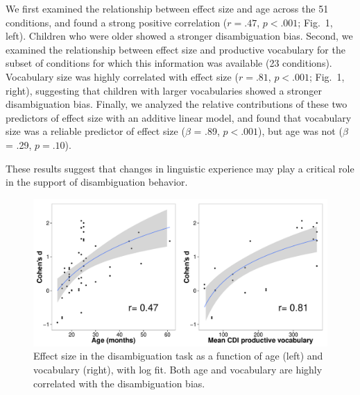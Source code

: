 \documentclass[12pt]{article}
\begin{document}
We first examined the relationship between effect size and age across the 51 conditions, and found a strong positive correlation ($r=.47$, $p<.001$; Fig.\ 1, left). Children who were older showed a stronger disambiguation bias. Second, we examined the relationship between effect size and productive vocabulary for the subset of conditions for which this information was available (23 conditions). Vocabulary size was highly correlated with effect size ($r=.81$, $p<.001$;  Fig.\ 1, right), suggesting that children with larger vocabularies showed a stronger disambiguation bias. Finally, we analyzed the relative contributions of these two predictors of effect size with an additive linear model, and found that vocabulary size was a reliable predictor of effect size ($\beta$ = .89, $p < .001$), but age was not ($\beta$ = .29, $p = .10$). 

These results suggest that changes in linguistic experience may play a critical role in the support of disambiguation behavior.
 

\begin{figure}[t]
\begin{center}
\includegraphics[scale = .5]{figs/d_age_vocab.pdf}
\end{center}
\caption{Effect size in the disambiguation task as a function of age (left) and vocabulary (right), with log fit. Both age and vocabulary are highly correlated with the disambiguation bias. }
\end{figure}
\end{document}
